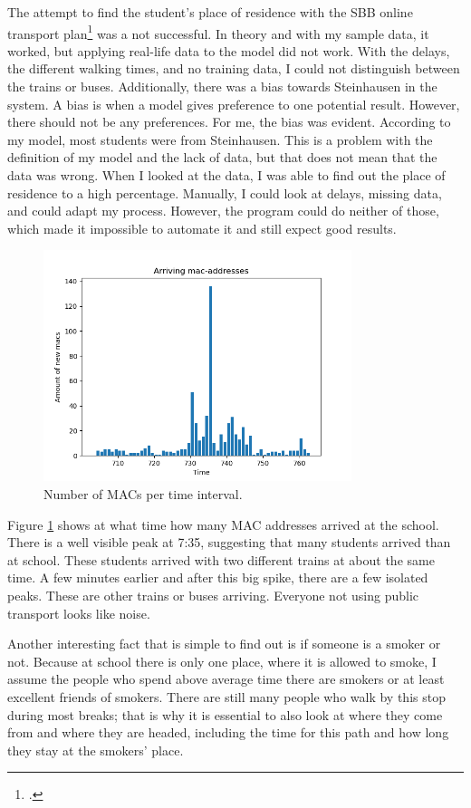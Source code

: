 \documentclass[paper=a4, fontsize=11pt]{article}
\begin{document}
The attempt to find the student's place of residence with the SBB online transport plan\footcite{sbbonlinefahrplan} was a not successful. In theory and with my sample data, it worked, but applying real-life data to the model did not work. With the delays, the different walking times, and no training data, I could not distinguish between the trains or buses. Additionally, there was a bias towards Steinhausen in the system. A bias is when a model gives preference to one potential result. However, there should not be any preferences. For me, the bias was evident. According to my model, most students were from Steinhausen. This is a problem with the definition of my model and the lack of data, but that does not mean that the data was wrong. When I looked at the data, I was able to find out the place of residence to a high percentage. Manually, I could look at delays, missing data, and could adapt my process. However, the program could do neither of those, which made it impossible to automate it and still expect good results.

\begin{figure}
\centering
\includegraphics [width = 9cm]{images/fridaymorning7-8v2.png}
\caption{Number of MACs per time interval.\label{fig:macarrive}}
\end{figure}



Figure \ref{fig:macarrive} shows at what time how many MAC addresses arrived at the school. There is a well visible peak at 7:35, suggesting that many students arrived than at school. These students arrived with two different trains at about the same time. A few minutes earlier and after this big spike, there are a few isolated peaks. These are other trains or buses arriving. Everyone not using public transport looks like noise.

Another interesting fact that is simple to find out is if someone is a smoker or not. Because at school there is only one place, where it is allowed to smoke, I assume the people who spend above average time there are smokers or at least excellent friends of smokers. There are still many people who walk by this stop during most breaks; that is why it is essential to also look at where they come from and where they are headed, including the time for this path and how long they stay at the smokers' place.
\end{document}
